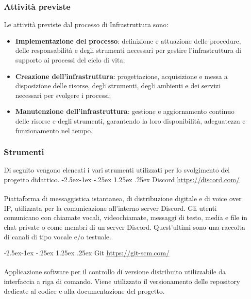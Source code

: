 \documentclass[a4paper,12pt]{article}
\makeatletter
\renewcommand\paragraph{\@startsection{paragraph}{4}{\z@}%
            {-2.5ex\@plus -1ex \@minus -.25ex}%
            {1.25ex \@plus .25ex}%
            {\normalfont\normalsize\bfseries}}
\makeatother
\begin{document}
        \subsubsection{Attività previste}
            Le attività previste dal processo di Infrastruttura sono:
            \begin{itemize}
                \item \textbf{Implementazione del processo}: definizione e attuazione delle procedure, delle responsabilità e degli strumenti necessari per gestire l'infrastruttura di supporto ai processi del ciclo di vita;
                \item \textbf{Creazione dell'infrastruttura}: progettazione, acquisizione e messa a disposizione delle risorse, degli strumenti, degli ambienti e dei servizi necessari per svolgere i processi;
                \item \textbf{Manutenzione dell'infrastruttura}: gestione e aggiornamento continuo delle risorse e degli strumenti, garantendo la loro disponibilità, adeguatezza e funzionamento nel tempo.
            \end{itemize}

        \subsubsection{Strumenti}
            Di seguito vengono elencati i vari strumenti utilizzati per lo svolgimento del progetto didattico.
            \paragraph{Discord} \label{strumenti:discord}
                \underline{\url{https://discord.com/}} \\\\
                Piattaforma di messaggistica istantanea, di distribuzione digitale e di voice over IP, utilizzata per la comunicazione all'interno server Discord.
                Gli utenti comunicano con chiamate vocali, videochiamate, messaggi di testo, media e file in chat private o come membri di un server Discord. Quest'ultimi sono una raccolta di canali di tipo vocale e/o testuale. 

            \paragraph{Git} \label{strumenti:git}
                \underline{\url{https://git-scm.com/}} \\\\
                Applicazione software per il controllo di versione distribuito utilizzabile da interfaccia a riga di comando. Viene utilizzato il versionamento delle repository dedicate al codice e alla documentazione del progetto.
            
\end{document}
